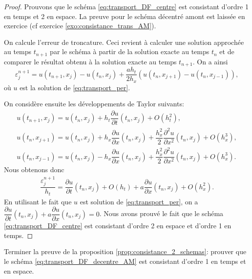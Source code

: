 \documentclass[12pt,a4paper,twoside]{article}
\begin{document}
\begin{proof}
  Prouvons que le sch\'ema \eqref{eq:transport_DF_centre} est consistant
  d'ordre 1 en temps et 2 en espace.
  La preuve pour le sch\'ema d\'ecentr\'e amont est laiss\'ee en exercice
  (cf exercice \ref{exo:consistance_trans_AM}).

  On calcule l'erreur de troncature. Ceci revient \`a 
  calculer une solution approch\'ee au temps $t_{n+1}$ par le sch\'ema \`a partir
  de la solution exacte au temps $t_n$ et de comparer le r\'esultat
  obtenu \`a la solution exacte au temps $t_{n+1}$.
  On a ainsi
  \[
    \varepsilon_j^{n+1} = u(t_{n+1},x_j) - u(t_n,x_j)
    + \dfrac{a h_t}{2 h_x} (u(t_n, x_{j+1}) - u(t_n, x_{j-1})) ,
  \]
  o\`u $u$ est la solution de \eqref{eq:transport_per}.

  On consid\`ere ensuite les d\'eveloppements de Taylor suivants:
  \begin{align*}
    u(t_{n+1} , x_j) = u(t_n , x_j) + h_t \dfrac{\partial u}{\partial t} (t_n , x_j)
    + O(h_t^2) ,
    \\
    u(t_n , x_{j+1} ) = u(t_n , x_{j} ) + h_x \dfrac{\partial u}{\partial x}(t_n, x_j)
    + \dfrac{h_x^2}{2} \dfrac{\partial^2 u}{\partial x^2}(t_n, x_j)
    + O(h_x^3) ,
    \\
    u(t_{n} , x_{j-1} ) = u(t_n , x_{j} ) - h_x \dfrac{\partial u}{\partial x}(t_n, x_j)
    + \dfrac{h_x^2}{2} \dfrac{\partial^2 u}{\partial x^2}(t_n, x_j)
    + O(h_x^3) .
  \end{align*}
  Nous obtenons donc
  \begin{align*}
    \dfrac{\varepsilon_j^{n+1}}{h_t} = \dfrac{\partial u}{\partial t}(t_n, x_j)
    + O (h_t) + a \dfrac{\partial u}{\partial x}(t_n, x_j) + O (h_x^2) .
  \end{align*}
  En utilisant le fait que $u$ est solution de \eqref{eq:transport_per},
  on a 
  $\dfrac{\partial u}{\partial t}(t_n, x_j) + a \dfrac{\partial u}{\partial x}(t_n, x_j) = 0$.
  Nous avons prouv\'e le fait que le sch\'ema \eqref{eq:transport_DF_centre}
  est consistant d'ordre 2 en espace et d'ordre 1 en temps.
\end{proof}

\begin{exercise}
  \label{exo:consistance_trans_AM}
  Terminer la preuve de la proposition \ref{prop:consistance_2_schemas}:
  prouver que le sch\'ema \eqref{eq:transport_DF_decentre_AM} est consistant
  d'ordre 1 en temps et en espace. 
\end{exercise}
\end{document}
